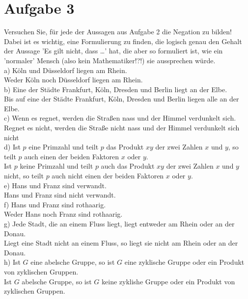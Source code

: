 \section*{Aufgabe 3}

Versuchen Sie, für jede der Aussagen aus Aufgabe 2 die Negation zu bilden!\\

Dabei ist es wichtig, eine Formulierung zu finden, die logisch genau den Gehalt der Aussage 'Es gilt nicht, dass \dots ' hat, die aber so formuliert ist, wie ein 'normaler' Mensch (also kein Mathematiker!?!) sie aussprechen würde.\\

a) Köln und Düsseldorf liegen am Rhein.\\

Weder Köln noch Düsseldorf liegen am Rhein.\\

b) Eine der Städte Frankfurt, Köln, Dresden und Berlin liegt an der Elbe.\\

Bis auf eine der Städte Frankfurt, Köln, Dresden und Berlin liegen alle an der Elbe.\\

c) Wenn es regnet, werden die Straßen nass und der Himmel verdunkelt sich.\\

Regnet es nicht, werden die Straße nicht nass und der Himmel verdunkelt sich nicht\\

d) Ist $p$ eine Primzahl und teilt $p$ das Produkt $xy$ der zwei Zahlen $x$ und $y$, so teilt $p$ auch einen der beiden Faktoren $x$ oder $y$.\\

Ist $p$ keine Primzahl und teilt $p$ auch das Produkt $xy$ der zwei Zahlen $x$ und $y$ nicht, so teilt $p$ auch nicht einen der beiden Faktoren $x$ oder $y$.\\

e) Hans und Franz sind verwandt.\\

Hans und Franz sind nicht verwandt.\\

f) Hans und Franz sind rothaarig.\\

Weder Hans noch Franz sind rothaarig.\\

g) Jede Stadt, die an einem Fluss liegt, liegt entweder am Rhein oder an der Donau.\\

Liegt eine Stadt nicht an einem Fluss, so liegt sie nicht am Rhein oder an der Donau.\\

h) Ist $G$ eine abelsche Gruppe, so ist $G$ eine zyklische Gruppe oder ein Produkt von zyklischen Gruppen.\\

Ist $G$ abelsche Gruppe, so ist $G$ keine zyklishe Gruppe oder ein Produkt von zyklischen Gruppen.

